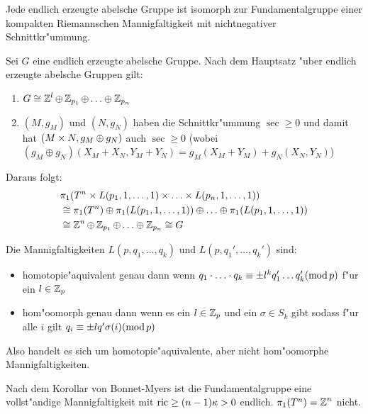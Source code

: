 \begin{kor}
Jede endlich erzeugte abelsche Gruppe ist isomorph zur Fundamentalgruppe einer kompakten Riemannschen Mannigfaltigkeit mit nichtnegativer Schnittkr"ummung.
\end{kor}

\begin{bew}
Sei $G$ eine endlich erzeugte abelsche Gruppe.
Nach dem Hauptsatz "uber endlich erzeugte abelsche Gruppen gilt:
\begin{enumerate}[label=(\arabic*)]
\item
	$G \cong \operatorname{\mathbb{Z}}^l \oplus \operatorname{\mathbb{Z}}_{p_1} \oplus \ldots \oplus \operatorname{\mathbb{Z}}_{p_n}$
\item
	$(M, g_M)$ und $(N, g_N)$ haben die Schnittkr"ummung $\sec \ge 0$ und damit hat $(M \times N, g_M \oplus g_N)$ auch $\sec \ge 0$ (wobei $(g_M \oplus g_N)(X_M + X_N, Y_M + Y_N) = g_M(X_M + Y_M) + g_N(X_N, Y_N)$)
\end{enumerate}
Daraus folgt:
\begin{align*}
	&\pi_1(T^n \times L(p_1, 1, \ldots ,1) \times \ldots \times L(p_n, 1, \ldots , 1)) \\
	&\cong \pi_1(T^n) \oplus \pi_1(L(p_1, 1, \ldots ,1)) \oplus \ldots \oplus \pi_1(L(p_1, 1, \ldots ,1)) \\
	&\cong \operatorname{\mathbb{Z}}^n \oplus \operatorname{\mathbb{Z}}_{p_1} \oplus \ldots \oplus \operatorname{\mathbb{Z}}_{p_n} \cong G
\end{align*}
\end{bew}

Die Mannigfaltigkeiten $L(p, q_1, \ldots ,q_k)$ und $L(p, q_1', \ldots ,q_k')$ sind:\begin{itemize}
\item
	homotopie"aquivalent genau dann wenn $q_1 \cdot \ldots \cdot q_k \equiv \pm l^k q_1' \ldots q_k' (\operatorname{mod} p)$ f"ur ein $l \in \operatorname{\mathbb{Z}}_p$ \cite{olum}
\item
	hom"oomorph genau dann wenn es ein $l \in \operatorname{\mathbb{Z}}_p$ und ein $\sigma \in S_k$ gibt sodass f"ur alle $i$ gilt $q_i \equiv \pm l q' \sigma(i) (\operatorname{mod} p)$ \cite{brody1960}
\end{itemize}
Also handelt es sich um homotopie"aquivalente, aber nicht hom"oomorphe Mannigfaltigkeiten.

\begin{Loes}
Nach dem Korollar von Bonnet-Myers ist die Fundamentalgruppe eine vollst"andige Mannigfaltigkeit mit $\operatorname{ric} \ge (n-1) \kappa > 0$ endlich.
$\pi_1(T^n) = \operatorname{\mathbb{Z}}^n$ nicht.
\end{Loes}

